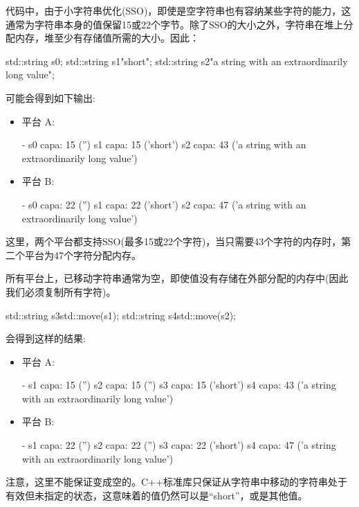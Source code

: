 代码中，由于小字符串优化(SSO)，即使是空字符串也有容纳某些字符的能力，这通常为字符串本身的值保留15或22个字节。除了SSO的大小之外，字符串在堆上分配内存，堆至少有存储值所需的大小。因此：

\begin{cppcode}
std::string s0;
std::string s1{"short"};
std::string s2{"a string with an extraordinarily long value"};
\end{cppcode}

可能会得到如下输出:

\begin{itemize}
	\item 平台 A:
	\begin{outputcode}
- s0 capa: 15 ('')
s1 capa: 15 ('short')
s2 capa: 43 ('a string with an extraordinarily long value')
	\end{outputcode}
	\item 平台 B:
	\begin{outputcode}
- s0 capa: 22 ('')
s1 capa: 22 ('short')
s2 capa: 47 ('a string with an extraordinarily long value')
	\end{outputcode}
\end{itemize}

这里，两个平台都支持SSO(最多15或22个字符)，当只需要43个字符的内存时，第二个平台为47个字符分配内存。

所有平台上，已移动字符串通常为空，即使值没有存储在外部分配的内存中(因此我们必须复制所有字符)。

\begin{cppcode}
std::string s3{std::move(s1)};
std::string s4{std::move(s2)};
\end{cppcode}

会得到这样的结果:

\begin{itemize}
	\item 平台 A:
	\begin{outputcode}
- s1 capa: 15 ('')
s2 capa: 15 ('')
s3 capa: 15 ('short')
s4 capa: 43 ('a string with an extraordinarily long value')
	\end{outputcode}
	\item 平台 B:
	\begin{outputcode}
- s1 capa: 22 ('')
s2 capa: 22 ('')
s3 capa: 22 ('short')
s4 capa: 47 ('a string with an extraordinarily long value')
	\end{outputcode}
\end{itemize}

注意，这里不能保证变成空的。C++标准库只保证从字符串中移动的字符串处于有效但未指定的状态，这意味着的值仍然可以是“short”，或是其他值。

